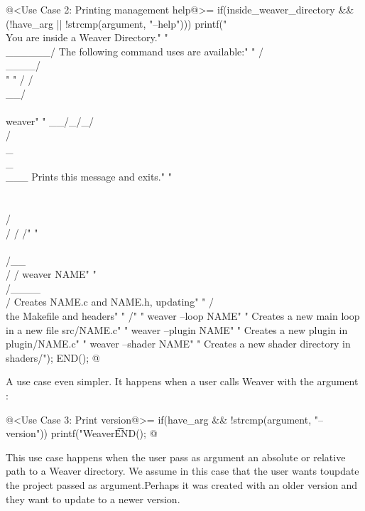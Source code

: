 {\iniciocodigo
@<Use Case 2: Printing management help@>=
if(inside_weaver_directory && (!have_arg || !strcmp(argument, "--help"))){
  printf("       \\                You are inside a Weaver Directory.\n"
  "        \\______/        The following command uses are available:\n"
  "        /\\____/\\\n"
  "       / /\\__/\\ \\       weaver\n"
  "    __/_/_/\\/\\_\\_\\___     Prints this message and exits.\n"
  "      \\ \\ \\/\\/ / /\n"
  "       \\ \\/__\\/ /       weaver NAME\n"
  "        \\/____\\/          Creates NAME.c and NAME.h, updating\n"
  "        /      \\          the Makefile and headers\n"
  "       /\n"
  "                        weaver --loop NAME\n"
  "                         Creates a new main loop in a new file src/NAME.c\n\n"
  "                        weaver --plugin NAME\n"
  "                         Creates a new plugin in plugin/NAME.c\n\n"
  "                        weaver --shader NAME\n"
  "                         Creates a new shader directory in shaders/\n");
  END();
}
@
\fimcodigo


A use case even simpler. It happens when a user calls Weaver with the
argument :

\iniciocodigo
@<Use Case 3: Print version@>=
if(have_arg && !strcmp(argument, "--version")){
  printf("Weaver\t%
  END();
}
@
\fimcodigo


This use case happens when the user pass as argument an absolute or
relative path to a Weaver directory. We assume in this case that the
user wants toupdate the project passed as argument.Perhaps it was
created with an older version and they want to update to a newer
version.

}
